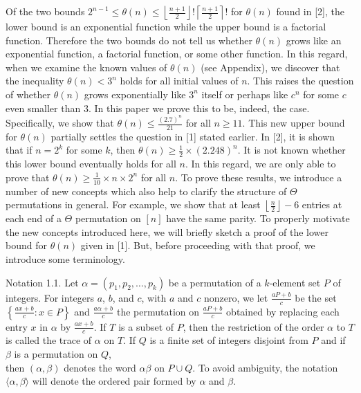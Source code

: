 \documentclass[10pt]{article}
\begin{document}
Of the two bounds $2^{n-1} \leq \theta(n) \leq\left\lfloor\frac{n+1}{2}\right\rfloor!\left\lceil\frac{n+1}{2}\right\rceil!$ for $\theta(n)$ found in [2], the lower bound is an exponential function while the upper bound is a factorial function. Therefore the two bounds do not tell us whether $\theta(n)$ grows like an exponential function, a factorial function, or some other function. In this regard, when we examine the known values of $\theta(n)$ (see Appendix), we discover that the inequality $\theta(n)<3^{n}$ holds for all initial values of $n$. This raises the question of whether $\theta(n)$ grows exponentially like $3^{n}$ itself or perhaps like $c^{n}$ for some $c$ even smaller than 3. In this paper we prove this to be, indeed, the case. Specifically, we show that $\theta(n) \leq \frac{(2.7)^{n}}{21}$ for all $n \geq 11$. This new upper bound for $\theta(n)$ partially settles the question in [1] stated earlier. In [2], it is shown that if $n=2^{k}$ for some $k$, then $\theta(n) \geq \frac{1}{2} \times(2.248)^{n}$. It is not known whether this lower bound eventually holds for all $n$. In this regard, we are only able to prove that $\theta(n) \geq \frac{1}{10} \times n \times 2^{n}$ for all $n$. To prove these results, we introduce a number of new concepts which also help to clarify the structure of $\Theta$ permutations in general. For example, we show that at least $\left\lfloor\frac{n}{2}\right\rfloor-6$ entries at each end of a $\Theta$ permutation on $[n]$ have the same parity. To properly motivate the new concepts introduced here, we will briefly sketch a proof of the lower bound for $\theta(n)$ given in [1]. But, before proceeding with that proof, we introduce some terminology.

Notation 1.1. Let $\alpha=\left(p_{1}, p_{2}, \ldots, p_{k}\right)$ be a permutation of a $k$-element set $P$ of integers. For integers $a$, $b$, and $c$, with $a$ and $c$ nonzero, we let $\frac{a P+b}{c}$ be the set $\left\{\frac{a x+b}{c}: x \in P\right\}$ and $\frac{a \alpha+b}{c}$ the permutation on $\frac{a P+b}{c}$ obtained by replacing each entry $x$ in $\alpha$ by $\frac{a x+b}{c}$. If $T$ is a subset of $P$, then the restriction of the order $\alpha$ to $T$ is called the trace of $\alpha$ on $T$. If $Q$ is a finite set of integers disjoint from $P$ and if $\beta$ is a permutation on $Q$,\\
then $(\alpha, \beta)$ denotes the word $\alpha \beta$ on $P \cup Q$. To avoid ambiguity, the notation $\langle\alpha, \beta\rangle$ will denote the ordered pair formed by $\alpha$ and $\beta$.
\end{document}
